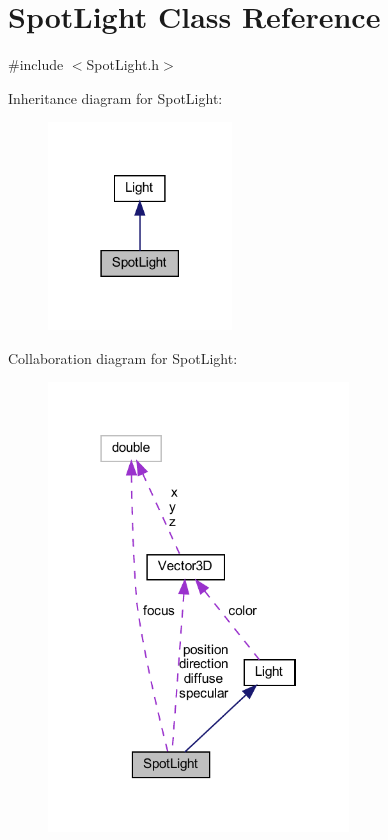 \hypertarget{classSpotLight}{}\section{Spot\+Light Class Reference}
\label{classSpotLight}


{\ttfamily \#include $<$Spot\+Light.\+h$>$}



Inheritance diagram for Spot\+Light\+:
\nopagebreak
\begin{figure}[H]
\begin{center}
\leavevmode
\includegraphics[width=138pt]{classSpotLight__inherit__graph}
\end{center}
\end{figure}


Collaboration diagram for Spot\+Light\+:
\nopagebreak
\begin{figure}[H]
\begin{center}
\leavevmode
\includegraphics[width=226pt]{classSpotLight__coll__graph}
\end{center}
\end{figure}
